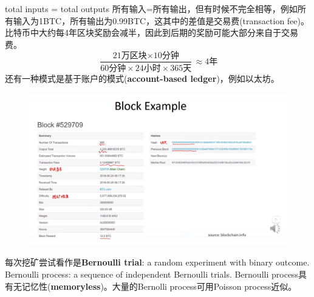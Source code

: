 \documentclass[10pt]{ctexart}
\begin{document}
total inputs = total outputs 所有输入=所有输出，但有时候不完全相等，例如所有输入为1BTC，所有输出为0.99BTC，这其中的差值是交易费(transaction fee)。比特币中大约每4年区块奖励会减半，因此到后期的奖励可能大部分来自于交易费。
$$
\frac{\text{21万区块}\times\text{10分钟}}{\text{60分钟}\times\text{24小时}\times\text{365天}} \approx \text{4年}
$$
还有一种模式是基于账户的模式(\textbf{account-based ledger})，例如以太坊。
\begin{figure}[H]
    \centering
    \includegraphics[width=1\textwidth]{courses/区块链技术与应用/lecture5/img2.png} 
\end{figure}
 
 
 
每次挖矿尝试看作是\textbf{Bernoulli trial}: a random experiment with binary outcome. Bernoulli process: a sequence of independent Bernoulli trials. Bernoulli process具有无记忆性(\textbf{memoryless})。大量的Bernolli process可用Poisson process近似。
\end{document}
